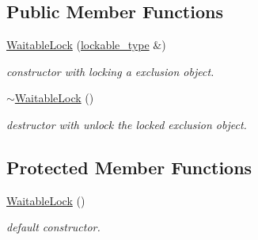 \subsection*{Public Member Functions}
\begin{DoxyCompactItemize}
\item 
\hypertarget{classhryky_1_1exclusion_1_1_waitable_lock_3_01_null_01_4_a88f47b5bf2f9ce4674eaaa49cb53e2da}{\hyperlink{classhryky_1_1exclusion_1_1_waitable_lock_3_01_null_01_4_a88f47b5bf2f9ce4674eaaa49cb53e2da}{Waitable\-Lock} (\hyperlink{classhryky_1_1_null}{lockable\-\_\-type} \&)}\label{classhryky_1_1exclusion_1_1_waitable_lock_3_01_null_01_4_a88f47b5bf2f9ce4674eaaa49cb53e2da}

\begin{DoxyCompactList}\small\item\em constructor with locking a exclusion object. \end{DoxyCompactList}\item 
\hypertarget{classhryky_1_1exclusion_1_1_waitable_lock_3_01_null_01_4_ae7eea2e5dee665c0c24930d2ffc96aec}{\hyperlink{classhryky_1_1exclusion_1_1_waitable_lock_3_01_null_01_4_ae7eea2e5dee665c0c24930d2ffc96aec}{$\sim$\-Waitable\-Lock} ()}\label{classhryky_1_1exclusion_1_1_waitable_lock_3_01_null_01_4_ae7eea2e5dee665c0c24930d2ffc96aec}

\begin{DoxyCompactList}\small\item\em destructor with unlock the locked exclusion object. \end{DoxyCompactList}\end{DoxyCompactItemize}
\subsection*{Protected Member Functions}
\begin{DoxyCompactItemize}
\item 
\hypertarget{classhryky_1_1exclusion_1_1_waitable_lock_3_01_null_01_4_ac73d7e1f3574ca6a826850c9f736afaf}{\hyperlink{classhryky_1_1exclusion_1_1_waitable_lock_3_01_null_01_4_ac73d7e1f3574ca6a826850c9f736afaf}{Waitable\-Lock} ()}\label{classhryky_1_1exclusion_1_1_waitable_lock_3_01_null_01_4_ac73d7e1f3574ca6a826850c9f736afaf}

\begin{DoxyCompactList}\small\item\em default constructor. \end{DoxyCompactList}\end{DoxyCompactItemize}


